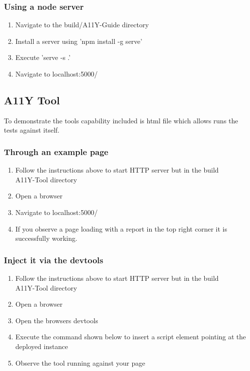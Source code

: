 \subsubsection{Using a node server}
\begin{enumerate}
\item Navigate to the build/A11Y-Guide directory
\item Install a server using 'npm install -g serve'
\item Execute 'serve -s .'
\item Navigate to localhost:5000/
\end{enumerate}

\subsection{A11Y Tool}
To demonstrate the tools capability included is html file which allows runs
the tests against itself.
\subsubsection{Through an example page}
\begin{enumerate}
\item Follow the instructions above to start HTTP server but in the
build\\A11Y-Tool directory
\item Open a browser
\item Navigate to localhost:5000/
\item If you observe a page loading with a report in the top right corner it
is successfully working.
\end{enumerate}

\subsubsection{Inject it via the devtools}
\begin{enumerate}
\item Follow the instructions above to start HTTP server but in the
build\\A11Y-Tool directory
\item Open a browser
\item Open the browsers devtools
\item Execute the command shown below to insert a script element pointing at
the deployed instance
\item Observe the tool running against your page
\end{enumerate}

